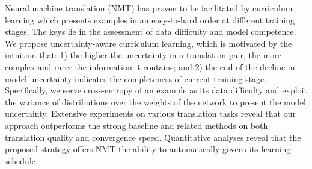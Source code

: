 Neural machine translation (NMT) has proven to be facilitated by curriculum learning which presents examples in an easy-to-hard order at different training stages. The keys lie in the assessment of data difficulty and model competence. We propose uncertainty-aware curriculum learning, which is motivated by the intuition that: 1) the higher the uncertainty in a translation pair, the more complex and rarer the information it contains; and 2) the end of the decline in model uncertainty indicates the completeness of current training stage. Specifically, we serve cross-entropy of an example as its data difficulty and exploit the variance of distributions over the weights of the network to present the model uncertainty. Extensive experiments on various translation tasks reveal that our approach outperforms the strong baseline and related methods on both translation quality and convergence speed. Quantitative analyses reveal that the proposed strategy offers NMT the ability to automatically govern its learning schedule.
